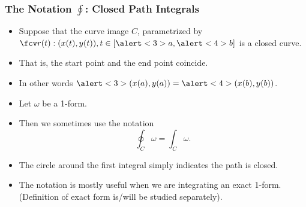 \begin{frame}
\frametitle{The Notation $\oint$: Closed Path Integrals}
\begin{itemize}
\item Suppose that the curve image $C$, parametrized by $\fcv r(t):(x(t), y(t)), t\in [\alert<3>{a},\alert<4>{b} ]$ is a closed curve.
\item<2-> That is, the \alert<3>{start point} and the \alert<4>{end point} coincide. 
\item<3-> In other words $\alert<3>{(x(a), y(a))}=\alert<4>{(x(b), y(b))}$.
\item<5-> Let $\omega$ be a 1-form.
\item<6-> Then we sometimes use the notation 
\[
\oint_C\omega = \int_C \omega.
\]
\item<7-> The circle around the first integral simply indicates the path is closed.
\item<8-> The notation is mostly useful when we are integrating an exact 1-form. (Definition of exact form is/will be studied separately).
\end{itemize}
\end{frame}